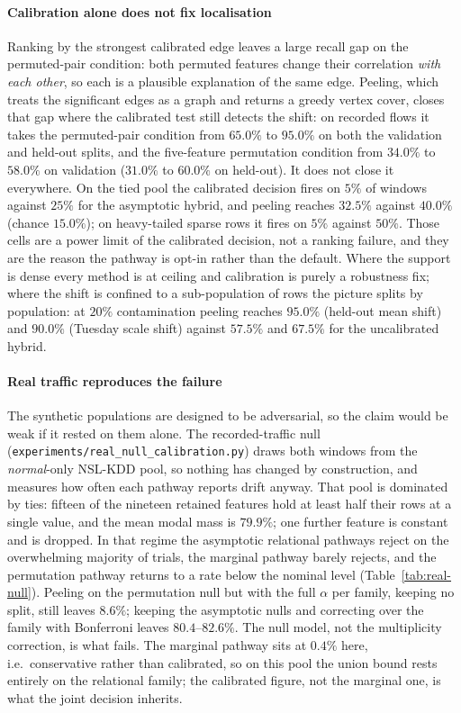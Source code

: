 \paragraph{Calibration alone does not fix localisation}
Ranking by the strongest calibrated edge leaves a large recall gap on the
permuted-pair condition: both permuted features change their correlation \emph{with each
other}, so each is a plausible explanation of the same edge. Peeling, which treats the
significant edges as a graph and returns a greedy vertex cover, closes that gap where the
calibrated test still detects the shift: on recorded flows it takes the permuted-pair
condition from $65.0\%$ to $95.0\%$ on both the validation and held-out splits, and the
five-feature permutation condition from $34.0\%$ to $58.0\%$ on validation ($31.0\%$ to
$60.0\%$ on held-out). It does not close it everywhere. On the
tied pool the calibrated decision fires on $5\%$ of windows against $25\%$ for the
asymptotic hybrid, and peeling reaches $32.5\%$ against $40.0\%$ (chance $15.0\%$); on
heavy-tailed sparse rows it fires on $5\%$ against $50\%$. Those cells are a power
limit of the calibrated decision, not a ranking failure, and they are the reason the
pathway is opt-in rather than the default. Where the support is dense every method is at
ceiling and calibration is purely a robustness fix; where the shift is confined to a
sub-population of rows the picture splits by population: at $20\%$ contamination peeling
reaches $95.0\%$ (held-out mean shift) and $90.0\%$ (Tuesday scale shift) against
$57.5\%$ and $67.5\%$ for the uncalibrated hybrid.

\paragraph{Real traffic reproduces the failure}
The synthetic populations are designed to be adversarial, so the claim would be weak if
it rested on them alone. The recorded-traffic null
(\texttt{experiments/real\_null\_calibration.py}) draws both windows from the
\emph{normal}-only NSL-KDD pool, so nothing has changed by construction, and measures how
often each pathway reports drift anyway. That pool is dominated by ties: fifteen of the
nineteen retained features hold at least half their rows at a single value, and the mean
modal mass is $79.9\%$; one further feature is constant and is dropped. In that regime the
asymptotic relational pathways reject on the overwhelming majority of trials, the
marginal pathway barely rejects, and the permutation pathway returns to a rate below the
nominal level (Table~\ref{tab:real-null}). Peeling on the permutation null but with the
full $\alpha$ per family, keeping no split, still leaves $8.6\%$; keeping the asymptotic
nulls and correcting over the family with Bonferroni leaves $80.4$--$82.6\%$. The null
model, not the multiplicity correction, is what fails. The marginal pathway sits
at $0.4\%$ here, i.e.\ conservative rather than calibrated, so on this pool the union
bound rests entirely on the relational family; the calibrated figure, not the marginal
one, is what the joint decision inherits.

